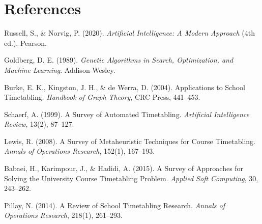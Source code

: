 
\chapter*{References}

\begin{enumerate}[leftmargin=2.0em, label={[\arabic*]}]
  \item Russell, S., \& Norvig, P. (2020). \textit{Artificial Intelligence: A Modern Approach} (4th ed.). Pearson.
  \item Goldberg, D. E. (1989). \textit{Genetic Algorithms in Search, Optimization, and Machine Learning}. Addison-Wesley.
  \item Burke, E. K., Kingston, J. H., \& de Werra, D. (2004). Applications to School Timetabling. \textit{Handbook of Graph Theory}, CRC Press, 441--453.
  \item Schaerf, A. (1999). A Survey of Automated Timetabling. \textit{Artificial Intelligence Review}, 13(2), 87--127.
  \item Lewis, R. (2008). A Survey of Metaheuristic Techniques for Course Timetabling. \textit{Annals of Operations Research}, 152(1), 167--193.
  \item Babaei, H., Karimpour, J., \& Hadidi, A. (2015). A Survey of Approaches for Solving the University Course Timetabling Problem. \textit{Applied Soft Computing}, 30, 243--262.
  \item Pillay, N. (2014). A Review of School Timetabling Research. \textit{Annals of Operations Research}, 218(1), 261--293.
\end{enumerate}
